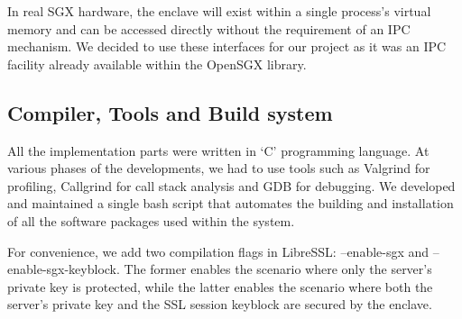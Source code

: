 \documentclass[../main.tex]{subfiles}
\begin{document}
In real SGX hardware, the enclave will exist within a single process's virtual
memory and can be accessed directly without the requirement of an IPC
mechanism. We decided to use these interfaces for our project as it was an IPC
facility already available within the OpenSGX library.

\subsection{Compiler, Tools and Build system}
All the implementation parts were written in `C' programming language. At
various phases of the developments, we had to use tools such as Valgrind for
profiling, Callgrind for call stack analysis and GDB for debugging. We
developed and maintained a single bash script that automates the building and
installation of all the software packages used within the system.

For convenience, we add two compilation flags in LibreSSL: --enable-sgx and
--enable-sgx-keyblock. The former enables the scenario where only the server's
private key is protected, while the latter enables the scenario where both the
server's private key and the SSL session keyblock are secured by the enclave.

\end{document}
